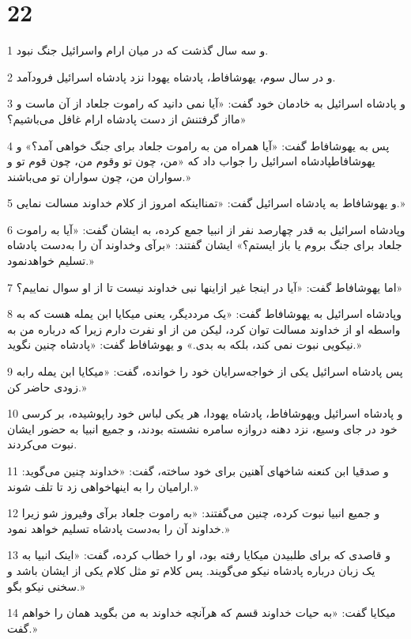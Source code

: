 \chapter{22}

\par 1 و سه سال گذشت که در میان ارام واسرائیل جنگ نبود.
\par 2 و در سال سوم، یهوشافاط، پادشاه یهودا نزد پادشاه اسرائیل فرودآمد.
\par 3 و پادشاه اسرائیل به خادمان خود گفت: «آیا نمی دانید که راموت جلعاد از آن ماست و مااز گرفتنش از دست پادشاه ارام غافل می‌باشیم؟»
\par 4 پس به یهوشافاط گفت: «آیا همراه من به راموت جلعاد برای جنگ خواهی آمد؟» و یهوشافاطپادشاه اسرائیل را جواب داد که «من، چون تو وقوم من، چون قوم تو و سواران من، چون سواران تو می‌باشند.»
\par 5 و یهوشافاط به پادشاه اسرائیل گفت: «تمنااینکه امروز از کلام خداوند مسالت نمایی.»
\par 6 وپادشاه اسرائیل به قدر چهارصد نفر از انبیا جمع کرده، به ایشان گفت: «آیا به راموت جلعاد برای جنگ بروم یا باز ایستم؟» ایشان گفتند: «برآی وخداوند آن را به‌دست پادشاه تسلیم خواهدنمود.»
\par 7 اما یهوشافاط گفت: «آیا در اینجا غیر ازاینها نبی خداوند نیست تا از او سوال نماییم؟»
\par 8 وپادشاه اسرائیل به یهوشافاط گفت: «یک مرددیگر، یعنی میکایا ابن یمله هست که به واسطه او از خداوند مسالت توان کرد، لیکن من از او نفرت دارم زیرا که درباره من به نیکویی نبوت نمی کند، بلکه به بدی.» و یهوشافاط گفت: «پادشاه چنین نگوید.»
\par 9 پس پادشاه اسرائیل یکی از خواجه‌سرایان خود را خوانده، گفت: «میکایا ابن یمله رابه زودی حاضر کن.»
\par 10 و پادشاه اسرائیل ویهوشافاط، پادشاه یهودا، هر یکی لباس خود راپوشیده، بر کرسی خود در جای وسیع، نزد دهنه دروازه سامره نشسته بودند، و جمیع انبیا به حضور ایشان نبوت می‌کردند.
\par 11 و صدقیا ابن کنعنه شاخهای آهنین برای خود ساخته، گفت: «خداوند چنین می‌گوید: ارامیان را به اینهاخواهی زد تا تلف شوند.»
\par 12 و جمیع انبیا نبوت کرده، چنین می‌گفتند: «به راموت جلعاد برآی وفیروز شو زیرا خداوند آن را به‌دست پادشاه تسلیم خواهد نمود.»
\par 13 و قاصدی که برای طلبیدن میکایا رفته بود، او را خطاب کرده، گفت: «اینک انبیا به یک زبان درباره پادشاه نیکو می‌گویند. پس کلام تو مثل کلام یکی از ایشان باشد و سخنی نیکو بگو.»
\par 14 میکایا گفت: «به حیات خداوند قسم که هرآنچه خداوند به من بگوید همان را خواهم گفت.»
